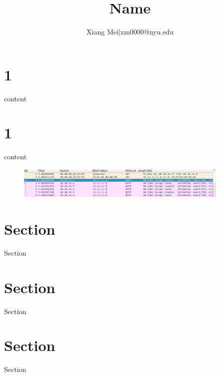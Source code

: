 \documentclass{article}
\author{Xiang Mei|xm0000@nyu.edu}
\title{Name}
\begin{document}
\maketitle
\section{1}

content

\section{1}
content

\begin{figure}[H]
    \includegraphics[width=4.00in]{PING.png}
    \centering
\end{figure}



\section{Section}

Section


\section{Section}

Section

\section{Section}

Section
\end{document}
